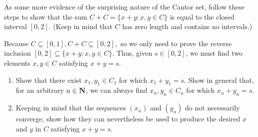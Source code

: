\documentclass{lew98_solutions}
\begin{document}
\begin{exercise}
\label{ex:3.3.7}
    As some more evidence of the surprising nature of the Cantor set, follow these steps to show that the sum \( C + C = \{ x + y : x, y \in C \} \) is equal to the closed interval \( [0, 2] \). (Keep in mind that \( C \) has zero length and contains no intervals.)

    Because \( C \subseteq [0, 1], C + C \subseteq [0, 2], \) so we only need to prove the reverse inclusion \( [0, 2] \subseteq \{ x + y : x, y \in C \} \). Thus, given \( s \in [0, 2] \), we must find two elements \( x, y \in C \) satisfying \( x + y = s \).
    \begin{enumerate}
        \item Show that there exist \( x_1, y_1 \in C_1 \) for which \( x_1 + y_1 = s \). Show in general that, for an arbitrary \( n \in \mathbf{N} \), we can always find \( x_n, y_n \in C_n \) for which \( x_n + y_n = s \).

        \item Keeping in mind that the sequences \( (x_n) \) and \( (y_n) \) do not necessarily converge, show how they can nevertheless be used to produce the desired \( x \) and \( y \) in \( C \) satisfying \( x + y = s \).
    \end{enumerate}
\end{exercise}
\end{document}

